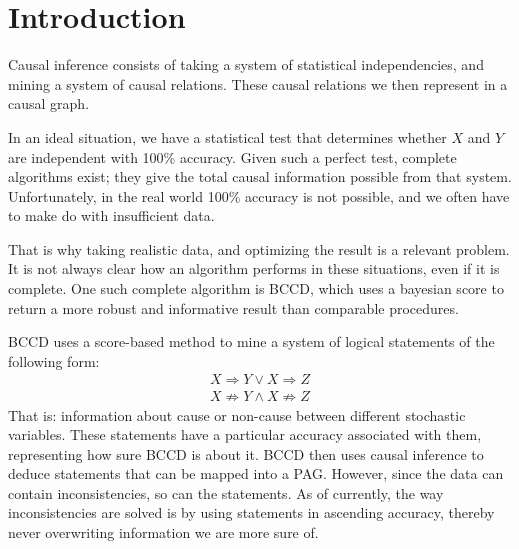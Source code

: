 \documentclass[11pt,a4paper]{report}
\begin{document}
\tableofcontents

\chapter{Introduction}\label{introduction}
Causal inference consists of taking a system of statistical
independencies, and mining a system of causal relations. These causal
relations we then represent in a causal graph.

In an ideal situation, we have a statistical test that determines
whether $X$ and $Y$ are independent with 100\% accuracy. Given such a
perfect test, complete algorithms exist; they give the total causal
information possible from that system. Unfortunately, in the real world
100\% accuracy is not possible, and we often have to make do with
insufficient data.

That is why taking realistic data, and optimizing the result is a relevant
problem. It is not always clear how an algorithm performs in these
situations, even if it is complete. One such complete algorithm is
BCCD\cite{claassenBayesianApproachConstraint2012}, which uses a bayesian
score to return a more robust and informative result than comparable
procedures.

BCCD uses a score-based method to mine a system of logical statements of
the following form:
\begin{align*}
  X \Rightarrow Y \lor X \Rightarrow Z \\
  X \not \Rightarrow Y \land X \not \Rightarrow Z
\end{align*}
That is: information about cause or non-cause between different stochastic
variables. These statements have a particular accuracy associated with
them, representing how sure BCCD is about it. BCCD then uses causal
inference to deduce statements that can be mapped into a PAG. However,
since the data can contain inconsistencies, so can the statements. As of
currently, the way inconsistencies are solved is by using statements in
ascending accuracy, thereby never overwriting information we are more sure
of.
\end{document}
